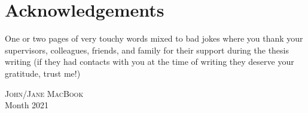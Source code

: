 \chapter*{Acknowledgements}
One or two pages of very touchy words mixed to bad jokes where you thank your supervisors, colleagues, friends, and family for their support during the thesis writing (if they had contacts with you at the time of writing they deserve your gratitude, trust me!)
\begin{flushright}
	{\scshape John/Jane MacBook}\\
	Month 2021
\end{flushright}